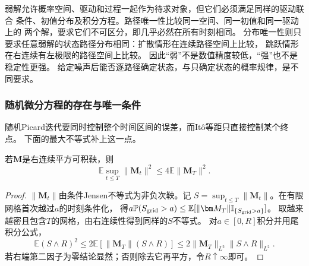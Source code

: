 弱解允许概率空间、驱动和过程一起作为待求对象，但它们必须满足同样的驱动联合
条件、初值分布及积分方程。路径唯一性比较同一空间、同一初值和同一驱动上的
两个解，要求它们不可区分，即几乎必然在所有时刻相同。
分布唯一性则只要求任意弱解的状态路径分布相同：扩散情形在连续路径空间上比较，
跳跃情形在右连续有左极限的路径空间上比较。
因此“弱”不是数值精度较低，“强”也不是稳定性更强。
给定噪声后能否逐路径确定状态，与只确定状态的概率规律，是不同要求。

\subsubsection{随机微分方程的存在与唯一条件}

随机Picard迭代要同时控制整个时间区间的误差，而Itô等距只直接控制某个终点。
下面的最大不等式补上这一点。
\begin{lemma}[二阶鞅最大不等式]
 \label{lem:action-state-doob-l2}
 若$\bm M$是右连续平方可积鞅，则
 \[
   \mathbb E\sup_{t\leq T}\|\bm M_t\|^2
      \leq4\mathbb E\|\bm M_T\|^2.
 \]
\end{lemma}
\begin{proof}
 $\|\bm M_t\|$由条件Jensen不等式为非负次鞅。记
 $S=\sup_{t\leq T}\|\bm M_t\|$。在有限网格首次越过$a$的时刻条件化，
 得$a\mathbb P(S_{\rm grid}>a)
 \leq\mathbb E[\|\bm M_T\|\mathbb I_{\{S_{\rm grid}>a\}}]$。
 取越来越密且包含$T$的网格，由右连续性得到同样的$S$不等式。
 对$a\in[0,R]$积分并用尾积分公式，
 \[
  \mathbb E(S\wedge R)^2
    \leq2\mathbb E[\|\bm M_T\|(S\wedge R)]
    \leq2\|\bm M_T\|_{L^2}\|S\wedge R\|_{L^2}.
 \]
 若右端第二因子为零结论显然；否则除去它再平方，令$R\uparrow\infty$即可。
\end{proof}

